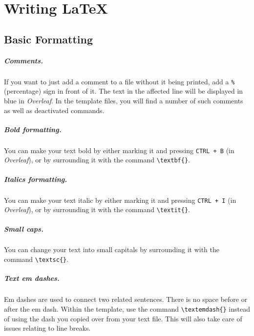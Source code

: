 \chapter{Writing \LaTeX{}} \label{c1_firstchapter:cha}

\section{Basic Formatting}\label{c1_basicformatting:sec}

\paragraph{Comments.} If you want to just add a comment to a file without it being printed, add a \lstinline[language=Tex]!%!
(percentage) sign in front of it. The text in the affected line will be displayed in blue in \textit{Overleaf}. In the template files, you will find a number of such comments as well as deactivated commands.

\paragraph{Bold formatting.} You can make your text bold by either marking it and pressing \lstinline!CTRL + B! (in \textit{Overleaf}), or by surrounding it with the command \lstinline[language=Tex]!\textbf{}!.

\paragraph{Italics formatting.} You can make your text italic by either marking it and pressing \lstinline!CTRL + I! (in \textit{Overleaf}), or by surrounding it with the command \lstinline[language=Tex]!\textit{}!.

\paragraph{Small caps.} You can change your text into small capitals by surrounding it with the command \lstinline[language=Tex]!\textsc{}!.
    
\paragraph{Text em dashes.} Em dashes are used to connect two related sentences. There is no space before or after the em dash. Within the template, use the command \lstinline[language=Tex]!\textemdash{}! instead of using the dash you copied over from your text file. This will also take care of issues relating to line breaks.

